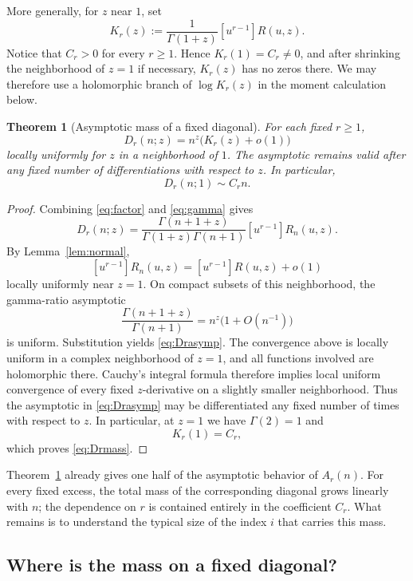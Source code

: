 \documentclass[11pt]{article}
\newtheorem{theorem}{Theorem}[section]
\theoremstyle{definition}
\begin{document}
More generally, for $z$ near $1$, set
\[
 K_r(z)
 :=
 \frac{1}{\Gamma(1+z)}
 [u^{r-1}]R(u,z).
\]
Notice that $C_r>0$ for every $r\geq1$.  Hence
$K_r(1)=C_r\neq0$, and after shrinking the neighborhood of
$z=1$ if necessary, $K_r(z)$ has no zeros there.  We may
therefore use a holomorphic branch of $\log K_r(z)$ in the
moment calculation below.


\begin{theorem}[Asymptotic mass of a fixed diagonal]
\label{thm:diagonalmass}
For each fixed $r\geq1$,
\begin{equation}\label{eq:Drasymp}
        D_r(n;z)
        =
        n^z\bigl(K_r(z)+o(1)\bigr)
\end{equation}
locally uniformly for $z$ in a neighborhood of $1$.  The asymptotic
remains valid after any fixed number of differentiations with respect
to $z$.  In particular,
\begin{equation}\label{eq:Drmass}
        D_r(n;1)\sim C_r n.
\end{equation}
\end{theorem}

\begin{proof}
Combining \eqref{eq:factor} and \eqref{eq:gamma} gives
\[
 D_r(n;z)
 =
 \frac{\Gamma(n+1+z)}
 {\Gamma(1+z)\Gamma(n+1)}
 [u^{r-1}]R_n(u,z).
\]
By Lemma~\ref{lem:normal},
\[
 [u^{r-1}]R_n(u,z)
 =
 [u^{r-1}]R(u,z)+o(1)
\]
locally uniformly near $z=1$.  On compact subsets of this
neighborhood, the gamma-ratio asymptotic
\[
 \frac{\Gamma(n+1+z)}{\Gamma(n+1)}
 =
 n^z\bigl(1+O(n^{-1})\bigr)
\]
is uniform.  Substitution yields \eqref{eq:Drasymp}.
The convergence above is locally uniform in a complex neighborhood
of $z=1$, and all functions involved are holomorphic there.
Cauchy's integral formula therefore implies local uniform convergence
of every fixed $z$-derivative on a slightly smaller neighborhood.
Thus the asymptotic in \eqref{eq:Drasymp} may be differentiated any fixed
number of times with respect to $z$. In particular, at
$z=1$ we have $\Gamma(2)=1$ and
\[
        K_r(1)=C_r,
\]
which proves \eqref{eq:Drmass}.
\end{proof}

Theorem~\ref{thm:diagonalmass} already gives one half of the
asymptotic behavior of $A_r(n)$.  For every fixed excess, the total
mass of the corresponding diagonal grows linearly with $n$; the
dependence on $r$ is contained entirely in the coefficient $C_r$.
What remains is to understand the typical size of the index $i$ that
carries this mass.

\subsection{Where is the mass on a fixed diagonal?}
\end{document}
